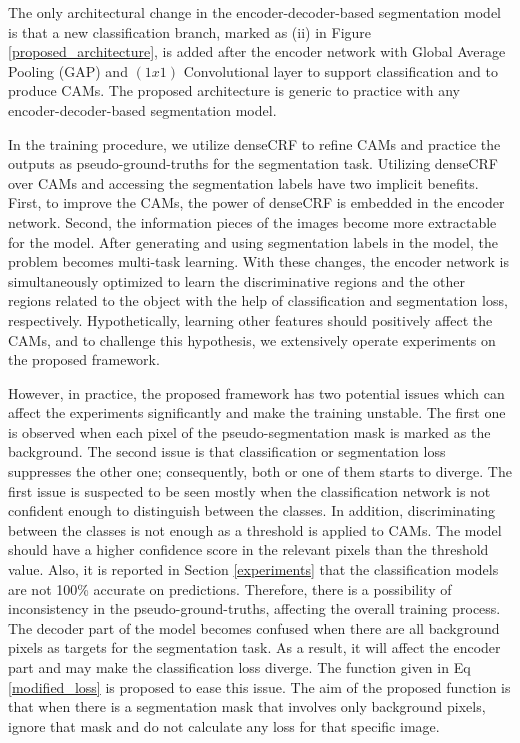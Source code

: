 \documentclass[sn-mathphys]{sn-jnl}
\theoremstyle{thmstyleone}
\theoremstyle{thmstyletwo}\newtheorem{example}{Example}\newtheorem{remark}{Remark}
\theoremstyle{thmstylethree}\newtheorem{definition}{Definition}
\begin{document}
The only architectural change in the encoder-decoder-based segmentation model is that a new classification branch, marked as (ii) in Figure \ref{proposed_architecture}, is added after the encoder network with Global Average Pooling (GAP) and \((1x1)\) Convolutional layer to support classification and to produce CAMs. The proposed architecture is generic to practice with any encoder-decoder-based segmentation model.

In the training procedure, we utilize denseCRF to refine CAMs and practice the outputs as pseudo-ground-truths for the segmentation task. Utilizing denseCRF over CAMs and accessing the segmentation labels have two implicit benefits. First, to improve the CAMs, the power of denseCRF is embedded in the encoder network. Second, the information pieces of the images become more extractable for the model. After generating and using segmentation labels in the model, the problem becomes multi-task learning. With these changes, the encoder network is simultaneously optimized to learn the discriminative regions and the other regions related to the object with the help of classification and segmentation loss, respectively. Hypothetically, learning other features should positively affect the CAMs, and to challenge this hypothesis, we extensively operate experiments on the proposed framework.

However, in practice, the proposed framework has two potential issues which can affect the experiments significantly and make the training unstable. The first one is observed when each pixel of the pseudo-segmentation mask is marked as the background. The second issue is that classification or segmentation loss suppresses the other one; consequently, both or one of them starts to diverge. The first issue is suspected to be seen mostly when the classification network is not confident enough to distinguish between the classes. In addition, discriminating between the classes is not enough as a threshold is applied to CAMs. The model should have a higher confidence score in the relevant pixels than the threshold value. Also, it is reported in Section \ref{experiments} that the classification models are not 100\% accurate on predictions. Therefore, there is a possibility of inconsistency in the pseudo-ground-truths, affecting the overall training process. The decoder part of the model becomes confused when there are all background pixels as targets for the segmentation task. As a result, it will affect the encoder part and may make the classification loss diverge.  
The function given in Eq \ref{modified_loss} is proposed to ease this issue. The aim of the proposed function is that when there is a segmentation mask that involves only background pixels, ignore that mask and do not calculate any loss for that specific image.
\end{document}
